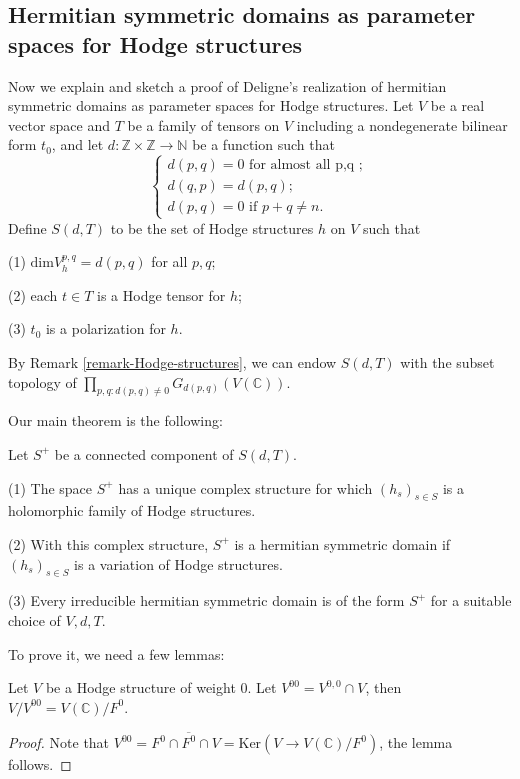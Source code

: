 \subsection{Hermitian symmetric domains as parameter spaces for Hodge structures}
 \label{subsection-Hermitian-for-Hodge}
Now we explain and sketch a proof of Deligne's realization of hermitian symmetric domains as parameter spaces for Hodge structures. Let $V$ be a real vector space and $T$ be a family of tensors on $V$ including a nondegenerate bilinear form $t_0$, and let $d: \mathbb Z \times \mathbb Z \to \mathbb N$ be a function such that 
$$
\begin{cases}
d(p,q)=0 \text{ for almost all p,q };\\ d(q,p)=d(p,q);\\ d(p,q) =0  \text{ if } p+q \ne n.
\end{cases}
$$
Define $S(d,T)$ to be the set of Hodge structures $h$ on $V$ such that 

(1) $\text{dim} V_h^{p,q} =d(p,q)$ for all $p,q$;

(2) each $t\in T$ is a Hodge tensor for $h$;

(3) $t_0$ is a polarization for $h$.

By Remark \ref{remark-Hodge-structures}, we can endow $S(d,T)$ with the subset topology of  $\prod_{p,q:d(p,q)\ne 0} G_{d(p,q)}(V(\mathbb C))$.  

Our main theorem is the following:

\begin{theorem}
 \label{theorem-Hermitian-for-Hodge}
 Let $S^+$ be a connected component of $S(d,T)$.

(1) The space $S^+$ has a unique complex structure for which $(h_s)_{s\in S}$ is a holomorphic family of Hodge structures.

(2) With this complex structure, $S^+$ is a hermitian symmetric domain if $(h_s)_{s\in S}$ is a variation of Hodge structures.

(3) Every irreducible hermitian symmetric domain is of the form $S^+$ for a suitable choice of $V,d, T$.
\end{theorem}

To prove it, we need a few lemmas:

\begin{lemma}
 \label{lemma-1}
 Let $V$ be a Hodge structure of weight 0. Let $V^{00}=V^{0,0} \cap V$, then $V/V^{00}=V(\mathbb C)/ F^0$.
\end{lemma} 

\begin{proof}
Note that $V^{00}=F^0 \cap \overline{F^0} \cap V = \text{Ker} (V \to V(\mathbb C)/F^0)$, the lemma follows. 
\end{proof}


